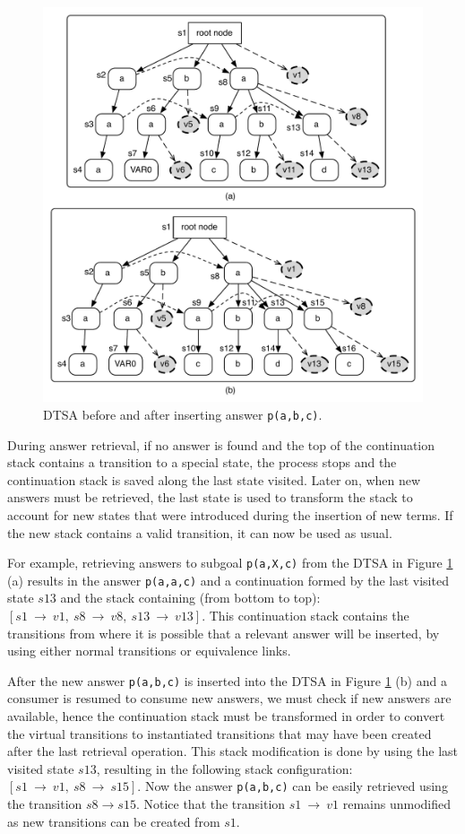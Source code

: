 \begin{figure}[ht]
  \centering
    \includegraphics[scale=0.6]{dtsa.pdf}
  \caption{DTSA before and after inserting answer \texttt{p(a,b,c)}.}
  \label{fig:dtsa_example}
\end{figure}

During answer retrieval, if no answer is found and the top of the continuation stack contains
a transition to a special state, the process stops and the continuation stack is saved along the last state
visited.
Later on, when new answers must be retrieved, the last state is used to transform the stack to account for new states that
were introduced during the insertion of new terms. If the new stack contains a valid transition, it
can now be used as usual.

For example, retrieving answers to subgoal \texttt{p(a,X,c)} from the DTSA in Figure
\ref{fig:dtsa_example} (a) results in the answer \texttt{p(a,a,c)} and a continuation
formed by the last visited state $s13$ and the stack containing (from bottom to top):
$[s1~\rightarrow~v1,~s8~\rightarrow~v8,~s13~\rightarrow~v13]$.
This continuation stack contains the transitions from where it is possible that a relevant
answer will be inserted, by using either normal transitions or equivalence links.

After the new answer \texttt{p(a,b,c)} is inserted into the DTSA in Figure \ref{fig:dtsa_example}
(b) and a consumer is resumed to consume new answers, we must check if new answers are available,
hence the continuation stack must be transformed in order to convert the virtual transitions to
instantiated transitions that may have been created after the last retrieval operation.
This stack modification is done by using the last visited state $s13$, resulting in the following
stack configuration: $[s1~\rightarrow~v1,~s8~\rightarrow~s15]$.
Now the answer \texttt{p(a,b,c)} can be easily retrieved using the transition $s8 \rightarrow s15$.
Notice that the transition $s1~\rightarrow~v1$ remains unmodified as new transitions can be created
from $s1$.

